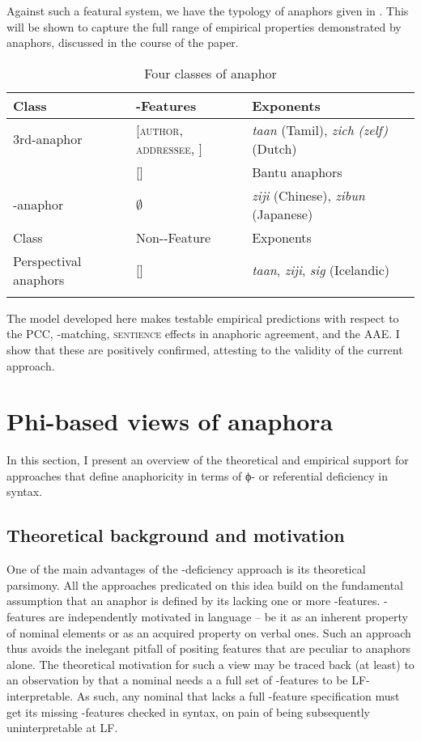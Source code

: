 \documentclass[output=paper, modfonts, nonflat]{langsci/langscibook}
\begin{document}
  Against such a featural system, we have the typology of anaphors
  given in . This will be shown to capture the full
  range of empirical properties demonstrated by anaphors, discussed in
  the course of the paper.
  
  \begin{table}
  	\caption{Four classes of anaphor\label{anaph3}}
  	\begin{tabularx}{\textwidth}{lQQ}  
  		\lsptoprule
  		Class &  \person-Features & Exponents\\  
  		\midrule
  		\textsc{3}rd-anaphor &  {[\textminus \textsc{author}, \textminus \textsc{addressee}, \sentience]} & \textit{taan} (Tamil),
  		\textit{zich} \textit{(zelf)} (Dutch)\\\tablevspace
  		  & [\sentience] & Bantu anaphors\\\tablevspace
  		\nul-anaphor &  $\emptyset$ & \textit{ziji} (Chinese),
  		\textit{zibun} (Japanese)\\
  		\midrule
  		Class & Non-\ph-Feature & Exponents\\
  		\midrule
  		Perspectival anaphors & [\dep] & \textit{taan},
  		\textit{ziji}, 
  		\textit{sig} (Icelandic)\\  		
  		\lspbottomrule
  	\end{tabularx}
  \end{table}
The model developed here makes testable empirical predictions with
  respect to the PCC, \ph-matching, \textsc{sentience} effects in anaphoric
  agreement, and the AAE. I show that these are positively confirmed,
  attesting to the validity of the current approach.

\newpage

\section{Phi-based views of anaphora}
\label{secphi}
In this section, I present an overview of the theoretical and empirical support
for approaches that define anaphoricity in terms of ϕ- or referential deficiency
in syntax.
\subsection{Theoretical background and motivation}
One of the main advantages of the \ph-deficiency approach is its
  theoretical parsimony. All the approaches predicated on this idea
  build on the fundamental assumption that an anaphor is defined by
  its lacking one or more \ph-features. \ph-features are independently
  motivated in language -- be it as an inherent property of nominal
  elements or as an acquired property on verbal ones. Such an approach
  thus avoids the inelegant pitfall of positing features that are
  peculiar to anaphors alone. The theoretical motivation for such a
  view may be traced back (at least) to an observation by
  \citet{bouchard:1984} that a nominal needs a a full set of
  \ph-features to be LF-interpretable. As such, any nominal that lacks
  a full \ph-feature specification must get its missing \ph-features
  checked in syntax, on pain of being subsequently uninterpretable at
  LF.
\end{document}
